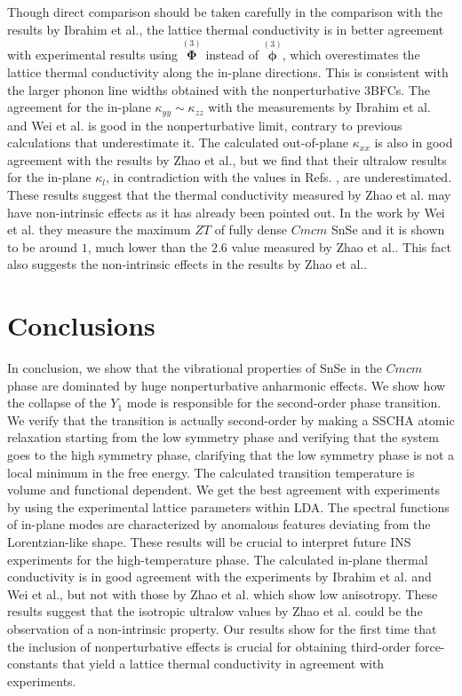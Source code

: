 Though direct comparison should be taken carefully in the comparison with the results by Ibrahim et al., the lattice 
thermal conductivity is in better agreement with experimental results using $\overset{(3)}{\boldsymbol{\Phi}}$ 
instead of $\overset{(3)}{\boldsymbol{\phi}}$, which overestimates the lattice thermal conductivity along the 
in-plane directions. This is consistent with the larger phonon line widths obtained with the nonperturbative 3BFCs. 
The agreement for the in-plane $\kappa_{yy} \sim \kappa_{zz}$ with the measurements by Ibrahim et al.\cite{ibrahim2017reinvestigation} and Wei et al.\cite{wei2019thermoelectric} is good in the nonperturbative limit, contrary to 
previous calculations that underestimate it\cite{skelton2016anharmonicity}. The calculated out-of-plane $\kappa_{xx}$ 
is also in good agreement with the results by Zhao et al.\cite{zhao2014ultralow}, but we find that their ultralow 
results for the in-plane $\kappa_l$, in contradiction with the values in Refs. 
\cite{ibrahim2017reinvestigation,wei2019thermoelectric}, are underestimated. These results suggest that the thermal 
conductivity measured by Zhao et al. may have non-intrinsic effects as it has already been pointed out\cite{wei2016intrinsic}. In the work by Wei et al. they measure the maximum $ZT$ of fully dense $Cmcm$ SnSe and it is shown to be 
around $1$, much lower than the $2.6$ value measured by Zhao et al.. This fact also suggests the non-intrinsic 
effects in the results by Zhao et al..

\section{Conclusions}

In conclusion, we show that the vibrational properties of SnSe in the $Cmcm$ phase are dominated by huge nonperturbative anharmonic effects. We show how the collapse of the $Y_1$ mode is responsible for the second-order 
phase transition. We verify that the transition is actually second-order by making a SSCHA atomic relaxation starting from the low symmetry phase and verifying that the system goes to the high symmetry phase, clarifying that the low symmetry phase is not a local minimum in the free energy. The calculated transition temperature is volume and functional dependent. We get the best agreement with experiments by using the experimental lattice parameters within LDA. The spectral functions of in-plane modes are characterized by anomalous features deviating from the Lorentzian-like shape. These results will be crucial to interpret future INS experiments for the high-temperature phase. The calculated in-plane thermal conductivity is in good agreement with the experiments by Ibrahim et al.\cite{ibrahim2017reinvestigation} and Wei et al.\cite{wei2019thermoelectric}, but not with those by Zhao et al.\cite{zhao2014ultralow} which show low anisotropy. These results suggest that the isotropic ultralow values by Zhao et al. could be the observation of a non-intrinsic property. Our results show for the first time that the inclusion of nonperturbative effects is crucial for obtaining third-order force-constants that yield a lattice thermal conductivity in agreement with experiments.
